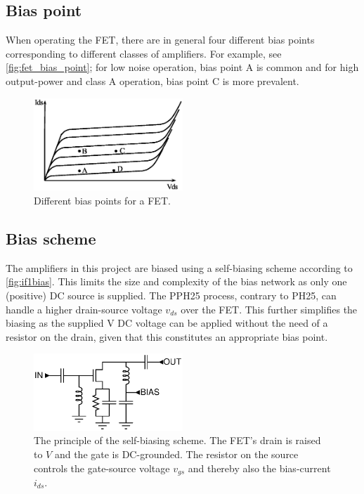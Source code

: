		\subsection{Bias point}
			When operating the FET, there are in general four different bias points corresponding to different classes of amplifiers.\autocite{gonzalez84} For example, see \autoref{fig:fet_bias_point}; for low noise operation, bias point A is common and for high output-power and class A operation, bias point C is more prevalent.

			\begin{figure}[hbt!]
				\centering
				\includegraphics[width=0.5\textwidth]{fig/amplifiers/fet_bias_point}
				\caption{Different bias points for a FET.}\label{fig:fet_bias_point}
			\end{figure}

		\subsection{Bias scheme}\label{sec:bias}
			The amplifiers in this project are biased using a self-biasing scheme according to \autoref{fig:if1bias}.\autocite{bahl03} This limits the size and complexity of the bias network as only one (positive) DC source is supplied. The PPH25 process, contrary to PH25, can handle a higher drain-source voltage $v_{ds}$ over the FET. This further simplifies the biasing as the supplied \unit[5]{V} DC voltage can be applied without the need of a resistor on the drain, given that this constitutes an appropriate bias point.

			\begin{figure}[hbt!]
				\centering
				\includegraphics[width=0.5\textwidth]{fig/amplifiers/if1/bias}
				\caption[Self-bias scheme.]{The principle of the self-biasing scheme. The FET's drain is raised to $V$ and the gate is DC-grounded. The resistor on the source controls the gate-source voltage $v_{gs}$ and thereby also the bias-current $i_{ds}$.}\label{fig:if1bias}
			\end{figure}


